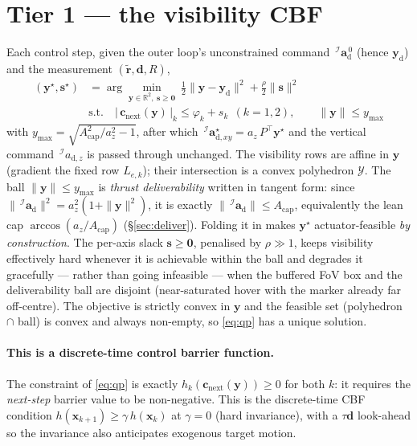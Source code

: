 \documentclass[11pt]{article}
\newcommand{\Iframe}{\mathcal{I}}
\begin{document}
\section{Tier 1 --- the visibility CBF}\label{sec:tier1}
Each control step, given the outer loop's unconstrained command $\,^\Iframe\boldsymbol{a}_\text{d}^{\,0}$
(hence $\boldsymbol{y}_\text{d}$) and the measurement $(\tilde{\boldsymbol{r}},\boldsymbol{d},R)$,
\begin{equation}\label{eq:qp}
\boxed{\;
\begin{aligned}
(\boldsymbol{y}^\star,\boldsymbol{s}^\star)&=\arg\min_{\boldsymbol{y}\in\mathbb{R}^2,\ \boldsymbol{s}\ge\boldsymbol{0}}\
\tfrac12\|\boldsymbol{y}-\boldsymbol{y}_\text{d}\|^2+\tfrac{\rho}{2}\|\boldsymbol{s}\|^2\\[2pt]
&\text{s.t.}\quad
\big|\,\boldsymbol{c}_\text{next}(\boldsymbol{y})\,\big|_k\le\varphi_k+s_k\ \ (k=1,2),
\qquad
\|\boldsymbol{y}\|\le y_\text{max}
\end{aligned}
\;}
\end{equation}
with $y_\text{max}=\sqrt{A_\text{cap}^2/a_z^2-1}$, after which
$\,^\Iframe\boldsymbol{a}_{\text{d},xy}^{\star}=a_z\,P^{\!\top}\boldsymbol{y}^\star$ and the vertical
command $\,^\Iframe a_{\text{d},z}$ is passed through unchanged. The visibility rows are affine in
$\boldsymbol{y}$ (gradient the fixed row $L_{e,k}$); their intersection is a convex polyhedron
$\mathcal{Y}$. The ball $\|\boldsymbol{y}\|\le y_\text{max}$ is \emph{thrust deliverability} written in
tangent form: since $\|\,^\Iframe\boldsymbol{a}_\text{d}\|^2=a_z^2(1+\|\boldsymbol{y}\|^2)$, it is exactly
$\|\,^\Iframe\boldsymbol{a}_\text{d}\|\le A_\text{cap}$, equivalently the lean cap
$\arccos(a_z/A_\text{cap})$ (\S\ref{sec:deliver}). Folding it in makes $\boldsymbol{y}^\star$
actuator-feasible \emph{by construction}. The per-axis slack $\boldsymbol{s}\ge\boldsymbol{0}$, penalised
by $\rho\gg1$, keeps visibility effectively hard whenever it is achievable within the ball and degrades it
gracefully --- rather than going infeasible --- when the buffered FoV box and the deliverability ball are
disjoint (near-saturated hover with the marker already far off-centre). The objective is strictly convex
in $\boldsymbol{y}$ and the feasible set (polyhedron $\cap$ ball) is convex and always non-empty, so
\eqref{eq:qp} has a unique solution.

\paragraph{This is a discrete-time control barrier function.} The constraint of \eqref{eq:qp} is exactly
$h_k(\boldsymbol{c}_\text{next}(\boldsymbol{y}))\ge0$ for both $k$: it requires the \emph{next-step}
barrier value to be non-negative. This is the discrete-time CBF condition
$h(\boldsymbol{x}_{k+1})\ge\gamma\,h(\boldsymbol{x}_k)$ at $\gamma=0$ (hard invariance), with a
$\tau\boldsymbol{d}$ look-ahead so the invariance also anticipates exogenous target motion.
\end{document}
